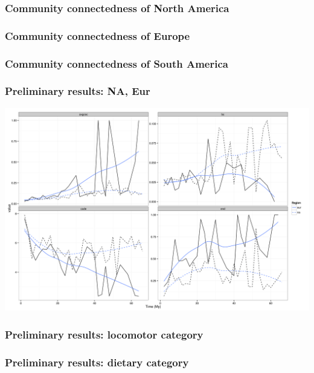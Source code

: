 \documentclass{beamer} \usepackage{amsmath,amsthm}
\begin{document}
\begin{frame}
  \frametitle{Community connectedness of North America}
\end{frame}

\begin{frame}
  \frametitle{Community connectedness of Europe}
\end{frame}

\begin{frame}
  \frametitle{Community connectedness of South America}
\end{frame}


\begin{frame}
  \frametitle{Preliminary results: NA, Eur}
  
  \begin{center}
    \includegraphics[height = 0.8\textheight, width = \textwidth, keepaspectratio = true]{figure/gen_bin}
  \end{center}
\end{frame}

\begin{frame}
  \frametitle{Preliminary results: locomotor category}

\end{frame}

\begin{frame}
  \frametitle{Preliminary results: dietary category}

\end{frame}
\end{document}
